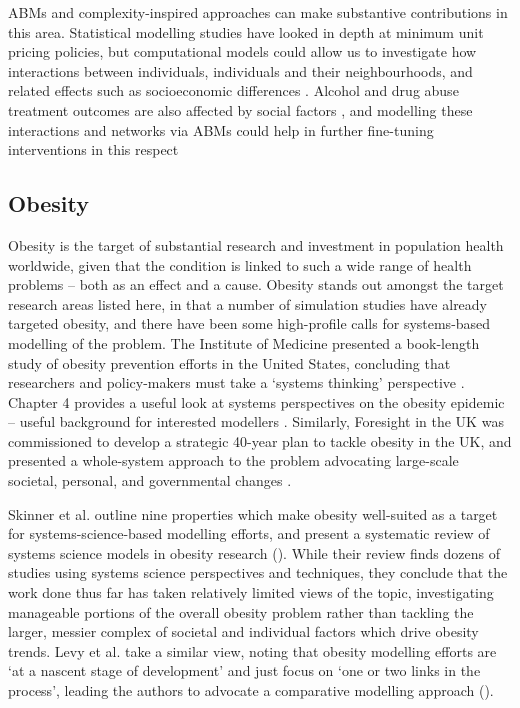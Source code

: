 \documentclass[review]{elsarticle}
\begin{document}
ABMs and complexity-inspired approaches can make substantive contributions in this area.  Statistical modelling studies have looked in depth at minimum unit pricing policies, but computational models could allow us to investigate how interactions between individuals, individuals and their neighbourhoods, and  related effects such as socioeconomic differences \citep{holmes2014}.  Alcohol and drug abuse treatment outcomes are also affected by social factors \citep{schroeder2001,homish2008}, and modelling these interactions and networks via ABMs could help in further fine-tuning interventions in this respect \citep{yorghos2018}

\subsection{Obesity}

Obesity is the target of substantial research and investment in population health worldwide, given that the condition is linked to such a wide range of health problems -- both as an effect and a cause.  Obesity stands out amongst the target research areas listed here, in that a number of simulation studies have already targeted obesity, and there have been some high-profile calls for systems-based modelling of the problem.  The Institute of Medicine presented a book-length study of obesity prevention efforts in the United States, concluding that researchers and policy-makers must take a `systems thinking' perspective \citep{IOM2010}.  Chapter 4 provides a useful look at systems perspectives on the obesity epidemic -- useful background for interested modellers \citep{IOM2010}.  Similarly, Foresight in the UK was commissioned to develop a strategic 40-year plan to tackle obesity in the UK, and presented a whole-system approach to the problem advocating large-scale societal, personal, and governmental changes \citep{Foresight2007}.

Skinner et al. outline nine properties which make obesity well-suited as a target for systems-science-based modelling efforts, and present a systematic review of systems science models in obesity research (\citep{skinner2013}).   While their review finds dozens of studies using systems science perspectives and techniques, they conclude that the work done thus far has taken relatively limited views of the topic, investigating manageable portions of the overall obesity problem rather than tackling the larger, messier complex of societal and individual factors which drive obesity trends.  Levy et al. take a similar view, noting that obesity modelling efforts are `at a nascent stage of development' and just focus on `one or two links in the process', leading the authors to advocate a comparative modelling approach (\citep[][p. 390]{levy2011}). 
\end{document}
